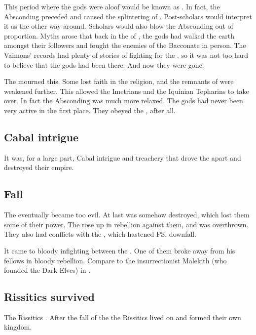 This period where the gods were aloof would be known as .
In fact, the Absconding preceded and caused the splintering of \Ortaica.
Post-\Ortaican \rethyactic scholars would interpret it as the other way around.
Scholars would also blow the Absconding out of proportion.
Myths arose that back in the  of \Ortaica, the gods had walked the earth amongst their followers and fought the enemies of the Bacconate in person.
The Vaimons' records had plenty of stories of \daemons fighting for the \Ortaicans, so it was not too hard to believe that the gods had been there. 
And now they were gone. 

The \rethyaxes mourned this.
Some lost faith in the \rethyactic religion, and the remnants of \Ortaica were weakened further.
This allowed the Imetrians and the Iquinian Tepharins to take over.
In fact the Absconding was much more relaxed. 
The gods had never been very active in the first place.
They obeyed the , after all.





\subsection{Cabal intrigue}
It was, for a large part, Cabal intrigue and treachery that drove the \Ortaicans apart and destroyed their empire.





\subsection{Fall}
The \Ortaicans{} eventually became too evil. 
At last \Ishicah was somehow destroyed, which lost them some of their power. 
The  \Tepharites{} rose up in rebellion against them, and \Ortaica{} was overthrown. 
They also had conflicts with the , which hastened \ps{\Ortaica}{} downfall. 

It came to bloody infighting between the \Ortaican{} \raebari. 
One of them broke away from his fellows in bloody rebellion. 
Compare to the insurrectionist Malekith (who founded the Dark Elves) in \cite{RPG:Warhammer:DarkElves}. 





\subsection{Rissitics survived}
The Rissitics . 
After the fall of the \bacconate{} the Rissitics lived on and formed their own kingdom. 









